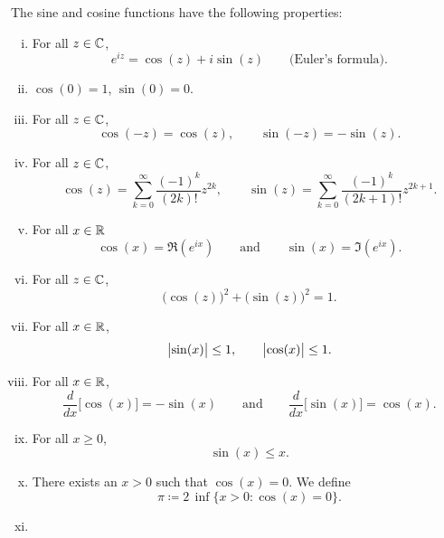 \begin{prop}
The sine and cosine functions have the following properties:
\begin{enumerate}[(i)]
\item For all $z \in {\mathbb{C}}$,
\begin{equation*}
e^{iz} = \cos(z) + i\sin(z) \qquad
\text{(Euler's formula)}.
\end{equation*}
\item $\cos(0) = 1$, $\sin(0) = 0$.
\item For all $z \in {\mathbb{C}}$,
\begin{equation*}
\cos(-z) = \cos(z), \qquad
\sin(-z) = -\sin(z).
\end{equation*}
\item For all $z \in {\mathbb{C}}$,
\begin{equation*}
\cos(z) = \sum_{k=0}^\infty \frac{{(-1)}^k}{(2k)!} z^{2k} ,
\qquad
\sin(z) = \sum_{k=0}^\infty \frac{{(-1)}^k}{(2k+1)!} z^{2k+1} .
\end{equation*}
\item For all $x \in {\mathbb{R}}$
\begin{equation*}
\cos(x) = \Re (e^{ix})
\qquad\text{and}\qquad
\sin(x) = \Im (e^{ix}) .
\end{equation*}
\item For all $z \in {\mathbb{C}}$,
\begin{equation*}
{\bigl( \cos(z) \bigr)}^2 + {\bigl( \sin(z) \bigr)}^2 = 1 .
\end{equation*}
\item For all $x \in {\mathbb{R}}$,
\begin{equation*}
\bigl\lvert {\sin(x)} \bigr\rvert \leq 1, \qquad \bigl\lvert {\cos(x)} \bigr\rvert \leq 1 .
\end{equation*}
\item For all $x \in {\mathbb{R}}$,
\begin{equation*}
\frac{d}{dx} \bigl[ \cos(x) \bigr] = -\sin(x)
\qquad \text{and} \qquad
\frac{d}{dx} \bigl[ \sin(x) \bigr] = \cos(x) .
\end{equation*}
\item For all $x \geq 0$,
\begin{equation*}
\sin(x) \leq x .
\end{equation*}
\item
There exists an $x > 0$ such that $\cos(x) = 0$.  We define
\begin{equation*}
\pi \coloneqq 2 \, \inf \{ x > 0 : \cos(x) = 0 \} .
\end{equation*}
\item

\end{enumerate}
\end{prop}
